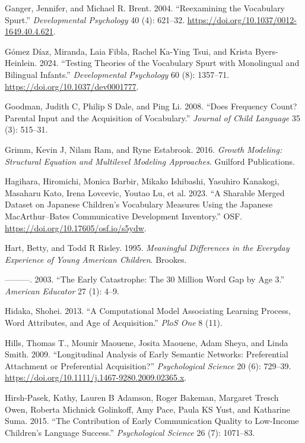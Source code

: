 \documentclass[
  11pt,
]{article}
\newlength{\cslhangindent}
\newenvironment{CSLReferences}[2] %
 {\begin{list}{}{%
  \setlength{\itemindent}{0pt}
  \setlength{\leftmargin}{0pt}
  \setlength{\parsep}{0pt}
  \ifodd #1
   \setlength{\leftmargin}{\cslhangindent}
   \setlength{\itemindent}{-1\cslhangindent}
  \fi
  \setlength{\itemsep}{#2\baselineskip}}}
 {\end{list}}
\begin{document}
\begin{CSLReferences}{1}{0}
Ganger, Jennifer, and Michael R. Brent. 2004. {``Reexamining the
Vocabulary Spurt.''} \emph{Developmental Psychology} 40 (4): 621--32.
\url{https://doi.org/10.1037/0012-1649.40.4.621}.

Gómez Díaz, Miranda, Laia Fibla, Rachel Ka-Ying Tsui, and Krista
Byers-Heinlein. 2024. {``Testing Theories of the Vocabulary Spurt with
Monolingual and Bilingual Infants.''} \emph{Developmental Psychology} 60
(8): 1357--71. \url{https://doi.org/10.1037/dev0001777}.

Goodman, Judith C, Philip S Dale, and Ping Li. 2008. {``Does Frequency
Count? Parental Input and the Acquisition of Vocabulary.''}
\emph{Journal of Child Language} 35 (3): 515--31.

Grimm, Kevin J, Nilam Ram, and Ryne Estabrook. 2016. \emph{Growth
Modeling: Structural Equation and Multilevel Modeling Approaches}.
Guilford Publications.

Hagihara, Hiromichi, Monica Barbir, Mikako Ishibashi, Yasuhiro Kanakogi,
Masaharu Kato, Irena Lovcevic, Youtao Lu, et al. 2023. {``A Sharable
Merged Dataset on {Japanese} Children's Vocabulary Measures Using the
{Japanese} {MacArthur}--{Bates} {Communicative} {Development}
{Inventory}.''} OSF. \url{https://doi.org/10.17605/osf.io/s5ydw}.

Hart, Betty, and Todd R Risley. 1995. \emph{Meaningful Differences in
the Everyday Experience of Young American Children}. Brookes.

---------. 2003. {``The Early Catastrophe: The 30 Million Word Gap by
Age 3.''} \emph{American Educator} 27 (1): 4--9.

Hidaka, Shohei. 2013. {``A Computational Model Associating Learning
Process, Word Attributes, and Age of Acquisition.''} \emph{PloS One} 8
(11).

Hills, Thomas T., Mounir Maouene, Josita Maouene, Adam Sheya, and Linda
Smith. 2009. {``Longitudinal Analysis of Early Semantic Networks:
Preferential Attachment or Preferential Acquisition?''}
\emph{Psychological Science} 20 (6): 729--39.
\url{https://doi.org/10.1111/j.1467-9280.2009.02365.x}.

Hirsh-Pasek, Kathy, Lauren B Adamson, Roger Bakeman, Margaret Tresch
Owen, Roberta Michnick Golinkoff, Amy Pace, Paula KS Yust, and Katharine
Suma. 2015. {``The Contribution of Early Communication Quality to
Low-Income Children's Language Success.''} \emph{Psychological Science}
26 (7): 1071--83.


\end{CSLReferences}
\end{document}
